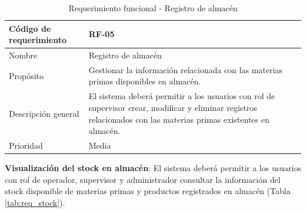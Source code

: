 \begin{table}[H]
    \centering
    \caption{Requerimiento funcional - Registro de almacén}
    \label{tab:req_almacen}
    \begin{tabularx}{\textwidth}{|X|X|}
        \hline
        Código de requerimiento & RF-05                                                                                                                                                             \\ \hline
        Nombre                  & Registro de almacén                                                                                                                                               \\ \hline
        Propósito               & Gestionar la información relacionada con las materias primas disponibles en almacén.                                                                              \\ \hline
        Descripción general     & El sistema deberá permitir a los usuarios con rol de supervisor crear, modificar y eliminar registros relacionados con las materias primas existentes en almacén. \\ \hline
        Prioridad               & Media                                                                                                                                                             \\ \hline
    \end{tabularx}
\end{table}

\textbf{Visualización del stock en almacén}: El sistema deberá permitir a los usuarios con rol de operador, supervisor y administrador consultar la información del stock disponible de materias primas y productos registrados en almacén (Tabla \ref{tab:req_stock}).

